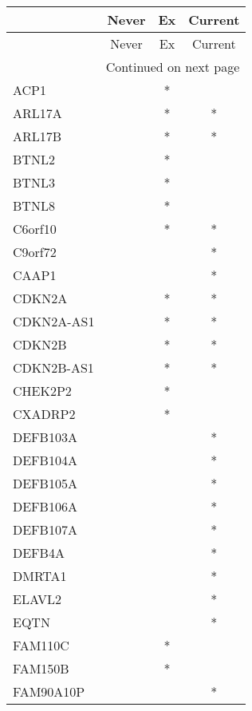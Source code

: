 \begin{longtable}{lccc}
\toprule
{} & Never & Ex & Current \\
\midrule
\endfirsthead

\toprule
{} & Never & Ex & Current \\
\midrule
\endhead
\midrule
\multicolumn{4}{r}{{Continued on next page}} \\
\midrule
\endfoot

\bottomrule
\endlastfoot
ACP1         &       &  * &         \\
ARL17A       &       &  * &       * \\
ARL17B       &       &  * &       * \\
BTNL2        &       &  * &         \\
BTNL3        &       &  * &         \\
BTNL8        &       &  * &         \\
C6orf10      &       &  * &       * \\
C9orf72      &       &    &       * \\
CAAP1        &       &    &       * \\
CDKN2A       &       &  * &       * \\
CDKN2A-AS1   &       &  * &       * \\
CDKN2B       &       &  * &       * \\
CDKN2B-AS1   &       &  * &       * \\
CHEK2P2      &       &  * &         \\
CXADRP2      &       &  * &         \\
DEFB103A     &       &    &       * \\
DEFB104A     &       &    &       * \\
DEFB105A     &       &    &       * \\
DEFB106A     &       &    &       * \\
DEFB107A     &       &    &       * \\
DEFB4A       &       &    &       * \\
DMRTA1       &       &    &       * \\
ELAVL2       &       &    &       * \\
EQTN         &       &    &       * \\
FAM110C      &       &  * &         \\
FAM150B      &       &  * &         \\
FAM90A10P    &       &    &       * \\

\end{longtable}
